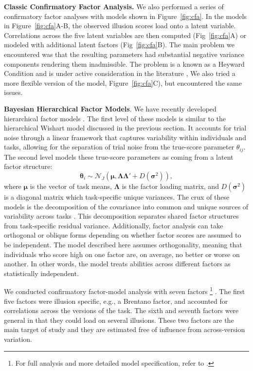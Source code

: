 {\bf Classic Confirmatory Factor Analysis.} We also performed a series of confirmatory factor analyses with models shown in Figure~\ref{fig:cfa}.  In the models in Figure~\ref{fig:cfa}A-B, the observed illusion scores  load onto a latent variable.  Correlations across the five latent variables are then computed (Fig~\ref{fig:cfa}A) or modeled with additional latent factors (Fig~\ref{fig:cfa}B).  The main problem we encountered was that the resulting parameters had substantial negative variance components rendering them inadmissible. The problem is a known as a Heyward Condition \parencite[]{Rindskopf.1984} and is under active consideration in the literature \parencite[]{Cooperman.Waller.2022}, We also tried a more flexible version of the model, Figure~\ref{fig:cfa}C), but encountered the same issues.

{\bf Bayesian Hierarchical Factor Models}. We have recently developed hierarchical factor models \parencite[]{Rouder.etal.2024a}. The first level of these models is similar to the hierarchical Wishart model discussed in the previous section. It accounts for trial noise through a linear framework that captures variability within individuals and tasks, allowing for the separation of trial noise from the true-score parameter $\theta_{ij}$.  The second level models these true-score parameters as coming from a latent factor structure:
\[
\pmb{\theta}_i \sim \mathcal{N}_J(\pmb\mu, 
\pmb\Lambda\pmb\Lambda' + D(\pmb\sigma^2)),
\]
where $\pmb\mu$ is the vector of task means, $\pmb\Lambda$ is the factor loading matrix, and $D(\pmb\sigma^2)$ is a diagonal matrix which task-specific unique variances.  The crux of these models is the decomposition of the covariance into common and unique sources of variability across tasks \parencite[]{Preacher.MacCallum.2003}. This decomposition separates shared factor structures from task-specific residual variance. Additionally, factor analysis can take orthogonal or oblique forms depending on whether factor scores are assumed to be independent. The model described here assumes orthogonality, meaning that individuals who score high on one factor are, on average, no better or worse on another. In other words, the model treats abilities across different factors as statistically independent.

We conducted confirmatory factor-model analysis with seven factors \footnote{For full analysis and more detailed model specification, refer to \textcite{Rouder.etal.2024a}.}
. The first five factors were illusion specific, e.g., a Brentano factor, and accounted for correlations across the versions of the task.  The sixth and seventh factors were general in that they could load on several illusions.  These two factors are the main target of study and they are estimated free of influence from across-version variation.  

